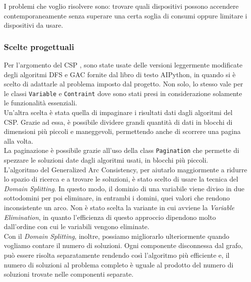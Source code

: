 \documentclass[12pt, letterpaper]{article}
\begin{document}
\noindent I problemi che voglio risolvere sono: trovare quali dispositivi possono accendere
contemporaneamente senza superare una certa soglia di consumi oppure limitare i
dispositivi da usare.

\subsubsection{Scelte progettuali}

\noindent Per l'argomento del CSP \cite{ai-python-csp}, sono state usate delle versioni leggermente modificate degli
algoritmi DFS e GAC fornite dal libro di testo AIPython, in quando si è scelto di adattarle al problema
imposto dal progetto. Non solo, lo stesso vale per le classi \texttt{Variable} e \texttt{Contraint} dove sono
stati presi in considerazione solamente le funzionalità essenziali. \\

\noindent Un'altra scelta è stata quella di impaginare \cite{pagination} i risultati dati dagli algoritmi del CSP.
Grazie ad essa, è possibile  dividere grandi quantità di dati in blocchi di dimensioni più piccoli e maneggevoli,
permettendo anche di scorrere una pagina alla volta. \\

\noindent La paginazione è possibile grazie all'uso della class \texttt{Pagination} che permette
di spezzare le soluzioni date dagli algoritmi usati, in blocchi più piccoli. \\

\noindent L'algoritmo del Generalized Arc Consistency, per aiutarlo maggiormente a ridurre lo spazio
di ricerca e a trovare le soluzioni, è stato scelto di usare la tecnica del \textit{Domain Splitting}.
In questo modo, il dominio di una variabile viene diviso in due sottodomini per poi
eliminare, in entrambi i domini, quei valori che rendono inconsistente un arco. Non è stato scelta la
variante in cui avviene la \textit{Variable Elimination}, in quanto l'efficienza di questo
approccio dipendono molto dall'ordine con cui le variabili vengono eliminate. \\

\noindent Con il \textit{Domain Splitting}, inoltre, possiamo migliorarlo ulteriormente quando
vogliamo contare il numero di soluzioni. Ogni componente disconnessa dal grafo, può essere risolta
separatamente rendendo così l'algoritmo più efficiente e, il numero di soluzioni al problema completo è uguale
al prodotto del numero di soluzioni trovate nelle componenti separate. \\
\end{document}
